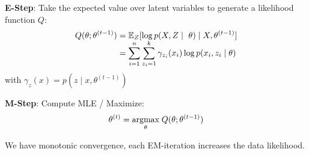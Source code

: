 \textbf{E-Step}: Take the expected value over latent variables to generate a likelihood function $Q$:
\begin{align*}
	Q(\theta ; \theta^{(t-1)}) &= \E_{Z}[ \log  p(X, Z \; | \; \theta) \; | \; X, \theta^{(t-1)}] \\[-5pt]
	&= \sum_{i=1}^n \sum_{z_i=1}^k \gamma_{z_i}(x_i) \log p(x_i, z_i \; | \; \theta)
\end{align*}
with $\gamma_z(x) = p(z \; | \; x, \theta^{(t-1)})$

\textbf{M-Step}: Compute MLE / Maximize:
$$\theta^{(t)} = \underset{\theta}{\text{argmax}} \; Q(\theta; \theta^{(t-1)})$$

We have monotonic convergence, each EM-iteration increases the data likelihood.
